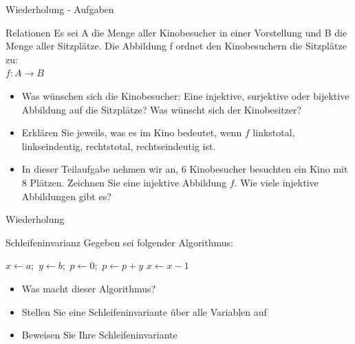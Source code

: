 	
	
	\begin{frame} {Wiederholung - Aufgaben}
		\begin{block}{Relationen}
			Es sei A die Menge aller Kinobesucher in einer Vorstellung 
			und B die Menge aller Sitzplätze. 
			Die Abbildung f ordnet den Kinobesuchern die Sitzplätze zu:\\
			\hspace{50pt}	$ f : A \rightarrow B $
			\begin{itemize}
				\pause
				\item Was wünschen sich die Kinobesucher: 
				Eine injektive, surjektive oder bijektive Abbildung 
				auf die Sitzplätze? Was wünscht sich der Kinobesitzer?
				
				\pause
				\item Erklären Sie jeweils, was es im Kino bedeutet, wenn $f$ linkstotal, linkseindeutig, rechtstotal, rechtseindeutig ist.
				
				\pause
				\item In dieser Teilaufgabe nehmen wir an, 6 Kinobesucher 
				besuchten ein Kino mit 8 Plätzen. 
				Zeichnen Sie eine injektive Abbildung $f$. 
				Wie viele injektive Abbildungen gibt es?
			\end{itemize}
		\end{block}
	\end{frame}
	
	
	
	\begin{frame} {Wiederholung}
		\begin{block}{Schleifeninvarianz}
			Gegeben sei folgender Algorithmus:\\
			\begin{algorithmic}
				\State $x \gets a;$
				\State $y \gets b;$
				\State $p \gets 0;$
					\State $p \gets p + y$
					\State $x \gets x - 1$
				\EndWhile
			\end{algorithmic}
			
			\begin{itemize}
				\pause
				\item Was macht dieser Algorithmus?
				
				\pause
				\item Stellen Sie eine Schleifeninvariante über alle 
				Variablen auf
				
				\pause
				\item Beweisen Sie Ihre Schleifeninvariante
			\end{itemize}						
		\end{block}
	\end{frame}
	
